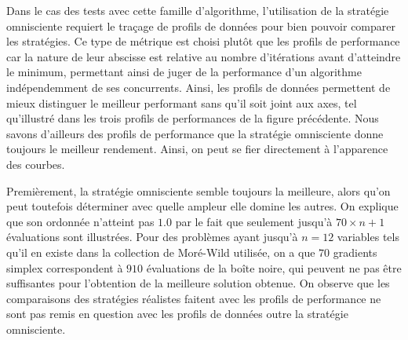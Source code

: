 Dans le cas des tests avec cette famille d'algorithme, l'utilisation de la stratégie omnisciente requiert le traçage de profils de données pour bien pouvoir comparer les stratégies.  Ce type de métrique est choisi plutôt que les profils de performance car la nature de leur abscisse est relative au nombre d'itérations avant d'atteindre le minimum, permettant ainsi de juger de la performance d'un algorithme indépendemment de ses concurrents. Ainsi, les profils de données permettent de mieux distinguer le meilleur performant sans qu'il soit joint aux axes, tel qu'illustré dans les trois profils de performances de la figure précédente. Nous savons d'ailleurs des profils de performance que la stratégie omnisciente donne toujours le meilleur rendement. Ainsi, on peut se fier directement à l'apparence des courbes.

Premièrement, la stratégie omnisciente semble toujours la meilleure, alors qu'on peut toutefois déterminer avec quelle ampleur elle domine les autres. On explique que son ordonnée n'atteint pas $1.0$ par le fait que seulement jusqu'à $70 \times n+1$ évaluations sont illustrées. Pour des problèmes ayant jusqu'à $n=12$ variables tels qu'il en existe dans la collection de Moré-Wild utilisée, on a que $70$ gradients simplex correspondent à $910$ évaluations de la boîte noire, qui peuvent ne pas être suffisantes pour l'obtention de la meilleure solution obtenue. On observe que les comparaisons des stratégies réalistes faitent avec les profils de performance ne sont pas remis en question avec les profils de données outre la stratégie omnisciente.
